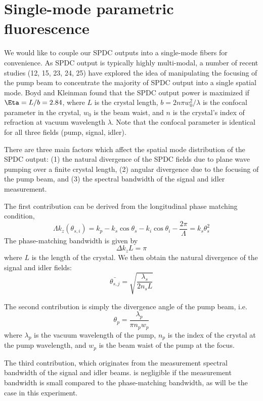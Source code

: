 \section{Single-mode parametric fluorescence}

We would like to couple our SPDC outputs into a single-mode fibers for convenience. As SPDC output is typically highly multi-modal, a number of recent studies (12, 15, 23, 24, 25) have explored the idea of manipulating the focusing of the pump beam to concentrate the majority of SPDC output into a single spatial mode. Boyd and Kleinman found that the SPDC output power is maximized if $\Eta = L/b = 2.84$, where $L$ is the crystal length, $b = 2n \pi w_0^2 / \lambda$ is the confocal parameter in the crystal, $w_0$ is the beam waist, and $n$ is the crystal's index of refraction at vacuum wavelength $\lambda$. Note that the confocal parameter is identical for all three fields (pump, signal, idler).

There are three main factors which affect the spatial mode distribution of the SPDC output: (1) the natural divergence of the SPDC fields due to plane wave pumping over a finite crystal length, (2) angular divergence due to the focusing of the pump beam, and (3) the spectral bandwidth of the signal and idler measurement.

The first contribution can be derived from the longitudinal phase matching condition,
\begin{equation}
\Lambda k_z (\theta_{s,i}) = k_p - k_s \cos \theta_s - k_i \cos \theta_i - \frac{2\pi}{\Lambda} = k_s \theta_s ^2
\end{equation}
The phase-matching bandwidth is given by
\begin{equation}
\Delta k_z L = \pi
\end{equation}
where $L$ is the length of the crystal. We then obtain the natural divergence of the signal and idler fields:
\begin{equation}
\bar{\theta_{s,j}} = \sqrt{\frac{\lambda_s}{2 n_s L}}
\end{equation}

The second contribution is simply the divergence angle of the pump beam, i.e.
\begin{equation}
\theta_p = \frac{\lambda_p}{\pi n_p w_p}
\end{equation}
where $\lambda_p$ is the vacuum wavelength of the pump, $n_p$ is the index of the crystal at the pump wavelength, and $w_p$ is the beam waist of the pump at the focus.

The third contribution, which originates from the measurement spectral bandwidth of the signal and idler beams. is negligible if the measurement bandwidth is small compared to the phase-matching bandwidth, as will be the case in this experiment.

